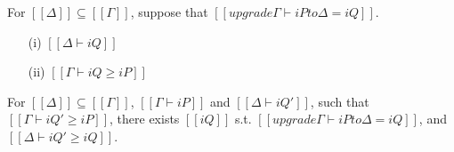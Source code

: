 \begin{lemma}
  For $[[Δ]] \subseteq [[Γ]]$,
  suppose that $[[upgrade Γ ⊢ iP to Δ = iQ]]$.
  \begin{enumerate}
    \item [(i)] $[[Δ ⊢ iQ]]$
    \item [(ii)] $[[Γ ⊢ iQ ≥ iP]]$
  \end{enumerate}
\end{lemma}

\begin{lemma}
  For $[[Δ]] \subseteq [[Γ]]$,
  $[[Γ ⊢ iP]]$ and $[[Δ ⊢ iQ']]$,
  such that $[[Γ ⊢ iQ' ≥ iP]]$,
  there exists $[[iQ]]$ s.t.
  $[[upgrade Γ ⊢ iP to Δ = iQ]]$, and
  $[[Δ ⊢ iQ' ≥ iQ]]$.
\end{lemma}

